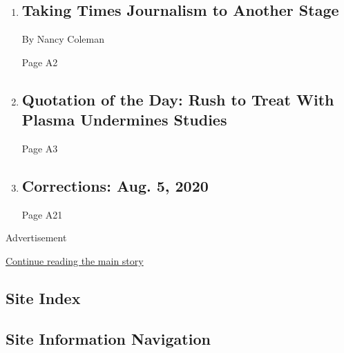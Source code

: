 \begin{enumerate}
\def\labelenumi{\arabic{enumi}.}
\item
  \href{/2020/08/05/insider/times-events.html}{}

  \hypertarget{taking-times-journalism-to-another-stage}{%
  \subsection{Taking Times Journalism to Another
  Stage}\label{taking-times-journalism-to-another-stage}}

  By Nancy Coleman

  Page A2
\item
  \href{/2020/08/04/todayspaper/quotation-of-the-day-rush-to-treat-with-plasma-undermines-studies.html}{}

  \hypertarget{quotation-of-the-day-rush-to-treat-with-plasma-undermines-studies}{%
  \subsection{Quotation of the Day: Rush to Treat With Plasma Undermines
  Studies}\label{quotation-of-the-day-rush-to-treat-with-plasma-undermines-studies}}

  Page A3
\item
  \href{/2020/08/04/pageoneplus/corrections-aug-5-2020.html}{}

  \hypertarget{corrections-aug-5-2020}{%
  \subsection{Corrections: Aug. 5, 2020}\label{corrections-aug-5-2020}}

  Page A21
\end{enumerate}

Advertisement

\protect\hyperlink{after-mid6}{Continue reading the main story}

\hypertarget{site-index}{%
\subsection{Site Index}\label{site-index}}

\hypertarget{site-information-navigation}{%
\subsection{Site Information
Navigation}\label{site-information-navigation}}

